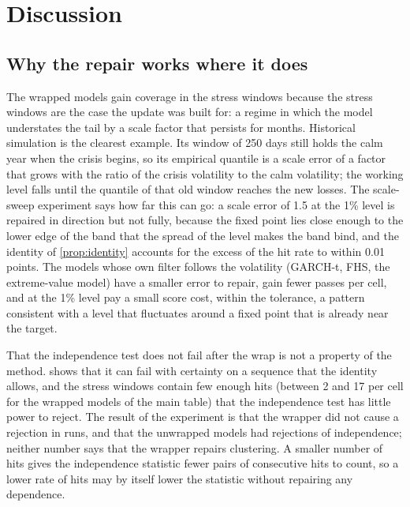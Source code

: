 \section{Discussion}
\label{sec:discussion}

\subsection{Why the repair works where it does}
\label{sec:discussion-why}

The wrapped models gain coverage in the stress windows because the stress windows are the case the update was built for: a regime in which the model understates the tail by a scale factor that persists for months. Historical simulation is the clearest example. Its window of 250 days still holds the calm year when the crisis begins, so its empirical quantile is a scale error of a factor that grows with the ratio of the crisis volatility to the calm volatility; the working level falls until the quantile of that old window reaches the new losses. The scale-sweep experiment says how far this can go: a scale error of 1.5 at the 1\% level is repaired in direction but not fully, because the fixed point lies close enough to the lower edge of the band that the spread of the level makes the band bind, and the identity of \cref{prop:identity} accounts for the excess of the hit rate to within 0.01 points. The models whose own filter follows the volatility (GARCH-t, FHS, the extreme-value model) have a smaller error to repair, gain fewer passes per cell, and at the 1\% level pay a small score cost, within the tolerance, a pattern consistent with a level that fluctuates around a fixed point that is already near the target.

That the independence test does not fail after the wrap is not a property of the method.  shows that it can fail with certainty on a sequence that the identity allows, and the stress windows contain few enough hits (between 2 and 17 per cell for the wrapped models of the main table) that the independence test has little power to reject. The result of the experiment is that the wrapper did not cause a rejection in \tenIndRunsAll{} runs, and that the unwrapped models had \tenIndFailUnwAll{} rejections of independence; neither number says that the wrapper repairs clustering. A smaller number of hits gives the independence statistic fewer pairs of consecutive hits to count, so a lower rate of hits may by itself lower the statistic without repairing any dependence.

